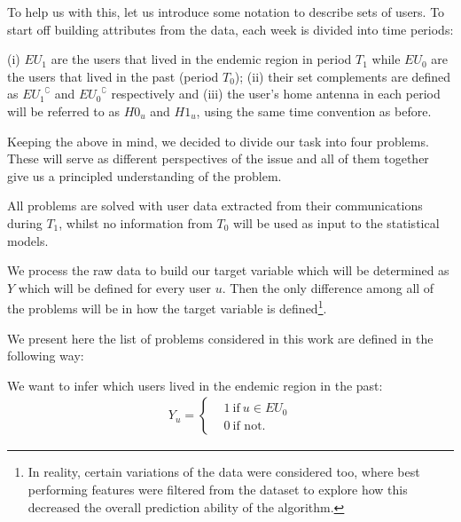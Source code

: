 To help us with this, let us introduce some notation to describe sets of users.
To start off building attributes from the data, each week is divided into time periods:
\begin{definition}\label{def:endemic_sets_periods}
	(i) $EU_{1}$ are the users that lived in the endemic region in period $T_1$ while $EU_{0}$ are the users that lived in the past (period $T_0$);
	(ii) their set complements are defined as ${ EU_1 }^{\complement}$ and ${ EU_0 }^{\complement}$ respectively and
	(iii) the user's home antenna in each period will be referred to as $H0_u$ and $H1_u$, using the same time convention as before.
\end{definition}




Keeping the above in mind, we decided to divide our task into four problems.
These will serve as different perspectives of the issue and all of them together give us a principled understanding of the problem.

All problems are solved with user data extracted from their communications during $T_1$, whilst no information from $T_0$ will be used as input to the statistical models.

We process the raw data to build our target variable which will be determined as $Y$ which will be defined for every user $u$.
Then the only difference among all of the problems will be in how the target variable is defined\footnote{In reality, certain variations of the data were considered too, where best performing features were filtered from the dataset to explore how this decreased the overall prediction ability of the algorithm.}.


We present here the list of problems considered in this work are defined in the following way:



\begin{problem}\label{target1}
We want to infer which users lived in the endemic region in the past:
		\begin{align*}
		Y_u =
		\begin{cases}
		&1 \ \mbox{if} \ u \in EU_{0} \\
		&0 \ \mbox{if not}.
		\end{cases}
		\end{align*}
\end{problem}

